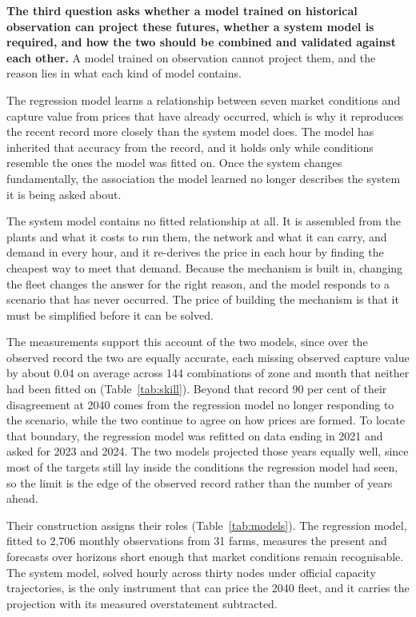 \textbf{The third question asks whether a model trained on historical
observation can project these futures, whether a system model is required, and
how the two should be combined and validated against each other.} A model
trained on observation cannot project them, and the reason lies in what each
kind of model contains.

The regression model learns a relationship between seven market conditions and
capture value from prices that have already occurred, which is why it reproduces
the recent record more closely than the system model does. The model has
inherited that accuracy from the record, and it holds only while conditions
resemble the ones the model was fitted on. Once the system changes
fundamentally, the association the model learned no longer describes the system
it is being asked about.

The system model contains no fitted relationship at all. It is assembled from
the plants and what it costs to run them, the network and what it can carry, and
demand in every hour, and it re-derives the price in each hour by finding the
cheapest way to meet that demand. Because the mechanism is built in, changing
the fleet changes the answer for the right reason, and the model responds to a
scenario that has never occurred. The price of building the mechanism is that it
must be simplified before it can be solved.

The measurements support this account of the two models, since over the
observed record the two are equally accurate, each missing observed capture value by about 0.04 on average across
144 combinations of zone and month that neither had been fitted on
(Table~\ref{tab:skill}). Beyond that record 90 per cent of their disagreement
at 2040 comes from the regression model no longer responding to the scenario,
while the two continue to agree on how prices are formed. To locate that
boundary, the regression model was refitted on data ending in 2021 and asked
for 2023 and 2024. The two models projected those years equally well, since
most of the targets still lay inside the conditions the regression model had
seen, so the limit is the edge of the observed record rather than the number
of years ahead.

Their construction assigns their roles (Table~\ref{tab:models}). The regression
model, fitted to 2,706 monthly observations from 31 farms, measures the present
and forecasts over horizons short enough that market conditions remain
recognisable. The system model, solved hourly across thirty nodes under official
capacity trajectories, is the only instrument that can price the 2040 fleet, and
it carries the projection with its measured overstatement subtracted.
